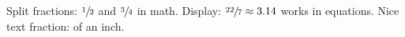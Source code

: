 \documentclass{article}
\begin{document}
Split fractions: $\sfrac{1}{2}$ and $\sfrac{3}{4}$ in math.
Display: $\sfrac{22}{7} \approx 3.14$ works in equations.
Nice text fraction:  of an inch.
\end{document}
